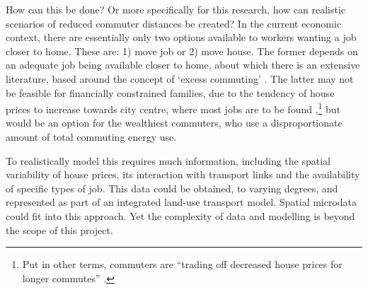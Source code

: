 How can this be done? Or more specifically for this research,
how can realistic scenarios of
reduced commuter distances be created? In the current economic context,
there are essentially only two options available to workers wanting a job
closer to home. These are: 1) move job or 2) move house. The former depends on
an adequate job being available closer to home, about which there is
an extensive literature, based around the concept of `excess commuting'
\citep{Buliung2002}.
The latter may not be feasible for financially constrained families,
due to the tendency of house prices to increase towards city centre, where
most jobs are to be found
\citep{Li2012},\footnote{Put in other terms,
commuters are ``trading off decreased house prices for longer commutes''
\citep[p.~312]{Li2012}.
}
but would be an option for the wealthiest commuters, who use a disproportionate
amount of total commuting energy use.

To realistically model this requires much information, including
the spatial variability
of house prices, its interaction with transport links and the availability
of specific types of job. This data could be obtained, to varying degrees,
and represented as part of an integrated land-use transport model.
Spatial microdata could fit into this approach.
Yet the complexity of data and modelling is beyond the scope of this project.


